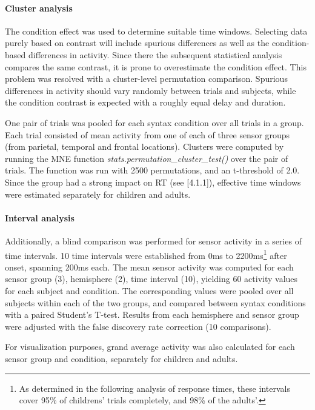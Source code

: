 \paragraph{Cluster analysis}
The condition effect was used to determine suitable time windows.
Selecting data purely based on contrast will include spurious differences as well as the condition-based differences in activity.
Since there the subsequent statistical analysis compares the same contrast, it is prone to overestimate the condition effect.
This problem was resolved with a cluster-level permutation comparison.
Spurious differences in activity should vary randomly between trials and subjects, while the condition contrast is expected with a roughly equal delay and duration.

One pair of trials was pooled for each syntax condition over all trials in a group.
Each trial consisted of mean activity from one of each of three sensor groups (from parietal, temporal and frontal locations).
Clusters were computed by running the MNE function \emph{stats.permutation\_cluster\_test()} \cite{3.3.clustertest} over the pair of trials.
The function was run with 2500 permutations, and an t-threshold of 2.0.
Since the group had a strong impact on RT (see [4.1.1]), effective time windows were estimated separately for children and adults.

\paragraph{Interval analysis}
Additionally, a blind comparison was performed for sensor activity in a series of time intervals.
10 time intervals were established from 0ms to 2200ms\footnote{As determined in the following analysis of response times, these intervals cover 95\% of childrens' trials completely, and 98\% of the adults'.} after onset, spanning 200ms each.
The mean sensor activity was computed for each sensor group (3), hemisphere (2), time interval (10), yielding 60 activity values for each subject and condition.
The corresponding values were pooled over all subjects within each of the two groups, and compared between syntax conditions with a paired Student's T-test.
Results from each hemisphere and sensor group were adjusted with the false discovery rate correction (10 comparisons).

For visualization purposes, grand average activity was also calculated for each sensor group and condition, separately for children and adults.

